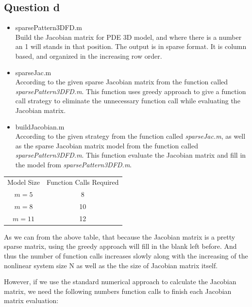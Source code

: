 \documentclass[11pt]{article}
\begin{document}
\subsection{Question d}
\begin{itemize}
\item sparsePattern3DFD.m\\

Build the Jacobian matrix for PDE 3D model, and where there is a number an 1 will stands in that position. The output is in sparse format. It is column based, and organized in the increasing row order.

\item sparseJac.m\\

According to the given sparse Jacobian matrix from the function called \textit{sparsePattern3DFD.m}. This function uses greedy approach to give a function call strategy to eliminate the unnecessary function call while evaluating the Jacobian matrix.

\item buildJacobian.m\\

According to the given strategy from the function called \textit{sparseJac.m}, as well as the sparse Jacobian matrix model from the function called \textit{sparsePattern3DFD.m}. This function evaluate the Jacobian matrix and fill in the model from \textit{sparsePattern3DFD.m}.

\end{itemize}


\begin{center}
\begin{tabular}{c c}
Model Size & Function Calls Required \\
$m =5$&8\\
$m = 8$&10\\
$m = 11$&12
\end{tabular}
\end{center}
As we can from the above table, that because the Jacobian matrix is a pretty sparse matrix, using the greedy approach will fill in the blank left before. And thus the number of function calls increases slowly along with the increasing of the nonlinear system size N as well as the the size of Jacobian matrix itself.

However, if we use the standard numerical approach to calculate the Jacobian matrix, we need the following numbers function calls to finish each Jacobian matrix evaluation:
\end{document}
